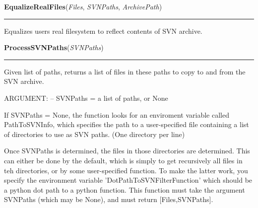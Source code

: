     \vspace{0.5ex}

\hspace{.8\funcindent}\begin{boxedminipage}{\funcwidth}

    \raggedright \textbf{EqualizeRealFiles}(\textit{Files}, \textit{SVNPaths}, \textit{ArchivePath})

    \vspace{-1.5ex}

    \rule{\textwidth}{0.5\fboxrule}
\setlength{\parskip}{2ex}
    Equalizes users real filesystem to reflect contents of SVN archive.

\setlength{\parskip}{1ex}
    \end{boxedminipage}

    \label{System:SVNOperations:ProcessSVNPaths}

    \vspace{0.5ex}

\hspace{.8\funcindent}\begin{boxedminipage}{\funcwidth}

    \raggedright \textbf{ProcessSVNPaths}(\textit{SVNPaths})

    \vspace{-1.5ex}

    \rule{\textwidth}{0.5\fboxrule}
\setlength{\parskip}{2ex}
    Given list of paths, returns a list of files in these paths to copy to 
    and from the SVN archive.

    ARGUMENT: -- SVNPaths = a list of paths, or None

    If SVNPaths = None, the function looks for an enviroment variable 
    called PathToSVNInfo, which specifies the path to a user-specified file
    containing a list of directories to use as SVN paths.  (One directory 
    per line)

    Once SVNPaths is determined, the files in those directories are 
    determined. This can either be done by the default, which is simply to 
    get recursively all files in teh directories, or by some user-specified
    function.  To make the latter work, you specify the environment 
    variable 'DotPathToSVNFilterFunction' which should be a python dot path
    to a python function. This function must take the argument SVNPaths 
    (which may be None), and must return [Files,SVNPaths].

\setlength{\parskip}{1ex}
    \end{boxedminipage}

